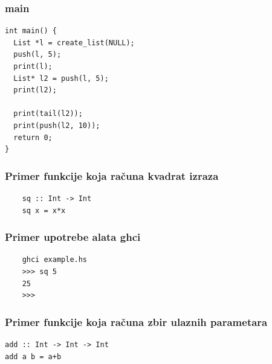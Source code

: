 \documentclass{beamer}
\begin{document}
\begin{frame}[fragile]
  \frametitle{main}
  \begin{lstlisting}
int main() {
  List *l = create_list(NULL);
  push(l, 5);
  print(l);
  List* l2 = push(l, 5);
  print(l2);
  
  print(tail(l2));
  print(push(l2, 10));
  return 0;
}
  \end{lstlisting}
\end{frame}


\begin{frame}[fragile]
  \frametitle{Primer funkcije koja računa kvadrat izraza}
  \begin{lstlisting}
    sq :: Int -> Int
    sq x = x*x
  \end{lstlisting}
\end{frame}


\begin{frame}[fragile]
  \frametitle{Primer upotrebe alata ghci}
  \begin{lstlisting}
    ghci example.hs 
    >>> sq 5 
    25
    >>>
  \end{lstlisting}
\end{frame}


\begin{frame}[fragile]
  \frametitle{Primer funkcije koja računa zbir ulaznih parametara}
  \begin{lstlisting}
add :: Int -> Int -> Int 
add a b = a+b
  \end{lstlisting}
\end{frame}
\end{document}
